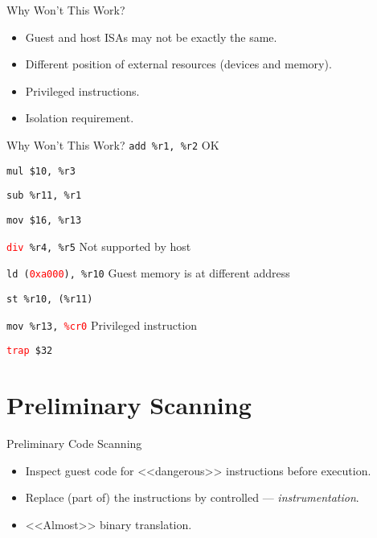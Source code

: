 \begin{frame}{Why Won't This Work?}
\pause
\begin{itemize}
\item Guest and host ISAs may not be exactly the same.
\item Different position of external resources (devices and memory).
\item Privileged instructions.
\item Isolation requirement.
\end{itemize}
\end{frame}

\begin{frame}{Why Won't This Work?}
\texttt{add \%r1, \%r2} \hfill OK

\texttt{mul \$10, \%r3}

\texttt{sub \%r11, \%r1}

\texttt{mov \$16, \%r13}

\medskip

\texttt{\textcolor{red}{div} \%r4, \%r5} \hfill Not supported by host

\medskip

\texttt{ld (\textcolor{red}{0xa000}), \%r10} \hfill Guest memory is at different address

\texttt{st \%r10, (\%r11)}

\medskip

\texttt{mov \%r13, \textcolor{red}{\%cr0}} \hfill Privileged instruction

\texttt{\textcolor{red}{trap} \$32}
\end{frame}

\section{Preliminary Scanning}

\begin{frame}{Preliminary Code Scanning}
\begin{itemize}
\item Inspect guest code for <<dangerous>> instructions before execution.
\item Replace (part of) the instructions by controlled --- \textit{instrumentation}.
\pause
\item{<<Almost>> binary translation.}
\end{itemize}
\end{frame}

